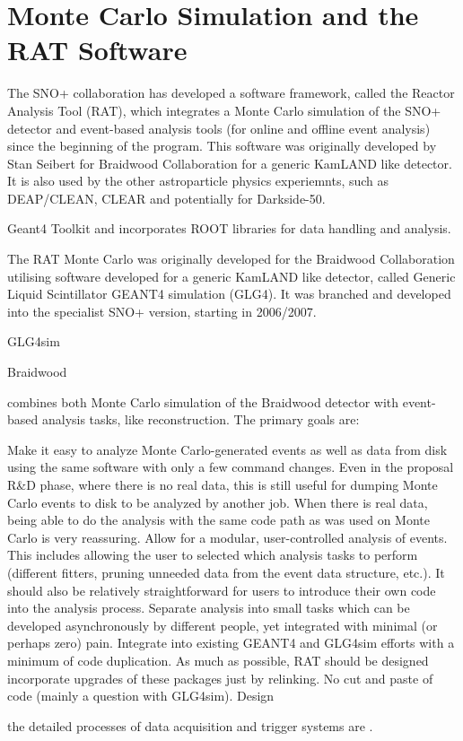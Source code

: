 \section{Monte Carlo Simulation and the RAT Software}
The SNO+ collaboration has developed a software framework, called the Reactor Analysis
Tool (RAT), which integrates a Monte Carlo simulation of the SNO+ detector and event-based analysis tools (for online and offline event analysis) since the beginning of the program. This software was originally developed by Stan Seibert for Braidwood Collaboration for a generic KamLAND like detector. It is also used by the other astroparticle physics experiemnts, such as DEAP/CLEAN, CLEAR and potentially for Darkside-50\cite{rat}.

Geant4 Toolkit and
incorporates ROOT libraries for data handling and analysis.

The RAT Monte Carlo was originally developed for the Braidwood Collaboration
utilising software developed for a generic KamLAND like detector, called Generic Liquid Scintillator GEANT4 simulation (GLG4). It was branched and
developed into the specialist SNO+ version, starting in 2006/2007.

GLG4sim


Braidwood

combines both Monte Carlo simulation of the Braidwood detector with event-based analysis tasks, like reconstruction. The primary goals are:

Make it easy to analyze Monte Carlo-generated events as well as data from disk using the same software with only a few command changes. Even in the proposal R\&D phase, where there is no real data, this is still useful for dumping Monte Carlo events to disk to be analyzed by another job. When there is real data, being able to do the analysis with the same code path as was used on Monte Carlo is very reassuring.
Allow for a modular, user-controlled analysis of events. This includes allowing the user to selected which analysis tasks to perform (different fitters, pruning unneeded data from the event data structure, etc.). It should also be relatively straightforward for users to introduce their own code into the analysis process.
Separate analysis into small tasks which can be developed asynchronously by different people, yet integrated with minimal (or perhaps zero) pain.
Integrate into existing GEANT4 and GLG4sim efforts with a minimum of code duplication. As much as possible, RAT should be designed incorporate upgrades of these packages just by relinking. No cut and paste of code (mainly a question with GLG4sim).
Design

the detailed processes of data acquisition and trigger systems are \cite{whitepaper}.

\cite{ratManual}





